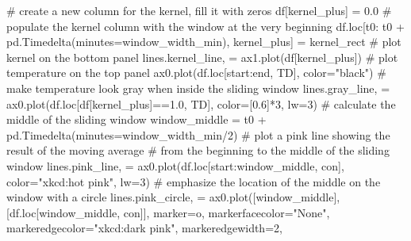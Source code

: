 \documentclass[
  letterpaper,
  DIV=11,
  numbers=noendperiod,
  oneside]{scrreprt}
\newenvironment{Shaded}{\begin{snugshade}}{\end{snugshade}}
\newcommand{\CommentTok}[1]{\textcolor[rgb]{0.37,0.37,0.37}{#1}}
\newcommand{\DecValTok}[1]{\textcolor[rgb]{0.68,0.00,0.00}{#1}}
\newcommand{\FloatTok}[1]{\textcolor[rgb]{0.68,0.00,0.00}{#1}}
\newcommand{\NormalTok}[1]{\textcolor[rgb]{0.00,0.23,0.31}{#1}}
\newcommand{\OperatorTok}[1]{\textcolor[rgb]{0.37,0.37,0.37}{#1}}
\newcommand{\StringTok}[1]{\textcolor[rgb]{0.13,0.47,0.30}{#1}}
\begin{document}
\begin{Shaded}
\begin{Highlighting}[]
\CommentTok{\# create a new column for the kernel, fill it with zeros}
\NormalTok{df[}\StringTok{\textquotesingle{}kernel\_plus\textquotesingle{}}\NormalTok{] }\OperatorTok{=} \FloatTok{0.0}
\CommentTok{\# populate the kernel column with the window at the very beginning}
\NormalTok{df.loc[t0: t0 }\OperatorTok{+}\NormalTok{ pd.Timedelta(minutes}\OperatorTok{=}\NormalTok{window\_width\_min), }\StringTok{\textquotesingle{}kernel\_plus\textquotesingle{}}\NormalTok{] }\OperatorTok{=}\NormalTok{ kernel\_rect}
\CommentTok{\# plot kernel on the bottom panel}
\NormalTok{lines.kernel\_line, }\OperatorTok{=}\NormalTok{ ax1.plot(df[}\StringTok{\textquotesingle{}kernel\_plus\textquotesingle{}}\NormalTok{])}
\CommentTok{\# plot temperature on the top panel}
\NormalTok{ax0.plot(df.loc[start:end, }\StringTok{\textquotesingle{}TD\textquotesingle{}}\NormalTok{], color}\OperatorTok{=}\StringTok{"black"}\NormalTok{)}
\CommentTok{\# make temperature look gray when inside the sliding window}
\NormalTok{lines.gray\_line, }\OperatorTok{=}\NormalTok{ ax0.plot(df.loc[df[}\StringTok{\textquotesingle{}kernel\_plus\textquotesingle{}}\NormalTok{]}\OperatorTok{==}\FloatTok{1.0}\NormalTok{, }\StringTok{\textquotesingle{}TD\textquotesingle{}}\NormalTok{],}
\NormalTok{                     color}\OperatorTok{=}\NormalTok{[}\FloatTok{0.6}\NormalTok{]}\OperatorTok{*}\DecValTok{3}\NormalTok{, lw}\OperatorTok{=}\DecValTok{3}\NormalTok{)}
\CommentTok{\# calculate the middle of the sliding window}
\NormalTok{window\_middle }\OperatorTok{=}\NormalTok{ t0 }\OperatorTok{+}\NormalTok{ pd.Timedelta(minutes}\OperatorTok{=}\NormalTok{window\_width\_min}\OperatorTok{/}\DecValTok{2}\NormalTok{)}
\CommentTok{\# plot a pink line showing the result of the moving average}
\CommentTok{\# from the beginning to the middle of the sliding window}
\NormalTok{lines.pink\_line, }\OperatorTok{=}\NormalTok{ ax0.plot(df.loc[start:window\_middle, }\StringTok{\textquotesingle{}con\textquotesingle{}}\NormalTok{], color}\OperatorTok{=}\StringTok{"xkcd:hot pink"}\NormalTok{, lw}\OperatorTok{=}\DecValTok{3}\NormalTok{)}
\CommentTok{\# emphasize the location of the middle on the window with a circle}
\NormalTok{lines.pink\_circle, }\OperatorTok{=}\NormalTok{ ax0.plot([window\_middle], [df.loc[window\_middle, }\StringTok{\textquotesingle{}con\textquotesingle{}}\NormalTok{]],}
\NormalTok{         marker}\OperatorTok{=}\StringTok{\textquotesingle{}o\textquotesingle{}}\NormalTok{, markerfacecolor}\OperatorTok{=}\StringTok{"None"}\NormalTok{, markeredgecolor}\OperatorTok{=}\StringTok{"xkcd:dark pink"}\NormalTok{, markeredgewidth}\OperatorTok{=}\DecValTok{2}\NormalTok{,}

\end{Highlighting}
\end{Shaded}
\end{document}
